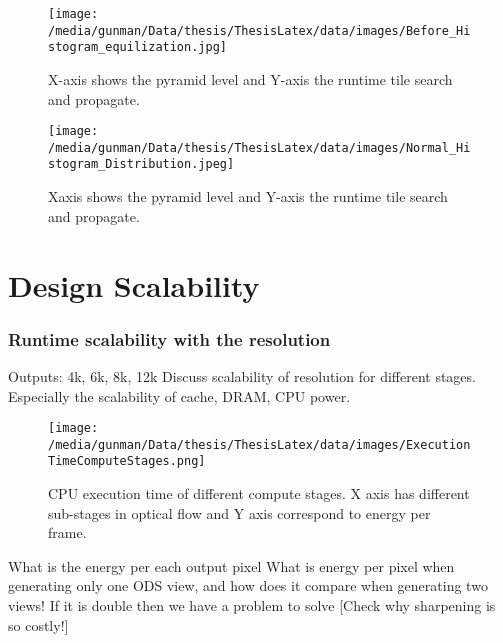 	\begin{figure*}
	\begin{center}
		\texttt{[image: /media/gunman/Data/thesis/ThesisLatex/data/images/Before\_Histogram\_equilization.jpg]}
		\caption{X-axis shows the pyramid level and Y-axis the runtime tile search and propagate.}
		\label{fig:ex_4_9}
	\end{center}
	\vspace{-0.3in}
\end{figure*} 

	\begin{figure*}
	\begin{center}
		\texttt{[image: /media/gunman/Data/thesis/ThesisLatex/data/images/Normal\_Histogram\_Distribution.jpeg]}
		\caption{Xaxis shows the pyramid level and Y-axis the runtime tile search and propagate.}
		\label{fig:ex_4_9}
	\end{center}
	\vspace{-0.3in}
\end{figure*} 


\section{Design Scalability}	

\subsubsection{Runtime scalability with the resolution}
Outputs:
4k, 6k, 8k, 12k
Discuss scalability of resolution for different stages. \newline
Especially the scalability of cache, DRAM, CPU power. 
\begin{figure*}
	\begin{center}
		\texttt{[image: /media/gunman/Data/thesis/ThesisLatex/data/images/ExecutionTimeComputeStages.png]}
		\caption{CPU execution time of different compute stages. X axis has different sub-stages in optical flow and Y axis correspond to energy per frame.}
		\label{fig:ex_4_9}
	\end{center}
	\vspace{-0.3in}
\end{figure*} 

What is the energy per each output pixel	
What is energy per pixel when generating only one ODS view, and how does it compare when generating two views! If it is double then we have a problem to solve	
[Check why sharpening is so costly!]

